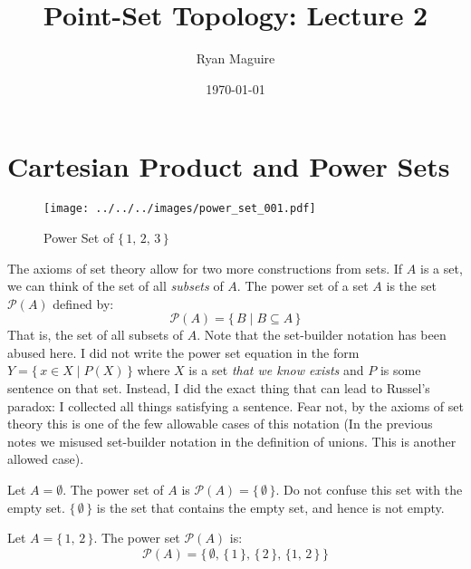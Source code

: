 \documentclass{article}
\title{Point-Set Topology: Lecture 2}
\author{Ryan Maguire}
\date{\today}
\theoremstyle{plain}
\theoremstyle{normal}
\newenvironment{example}{%
    \pushQED{\qed}\renewcommand{\qedsymbol}{$\blacksquare$}\examplex%
}{%
    \popQED\endexamplex%
}
\newenvironment{definition}{%
    \pushQED{\qed}\renewcommand{\qedsymbol}{$\blacksquare$}\definitionx%
}{%
    \popQED\enddefinitionx%
}
\begin{document}
    \maketitle
    \section{Cartesian Product and Power Sets}
        \begin{figure}
            \centering
            \texttt{[image: ../../../images/power\_set\_001.pdf]}
            \caption{Power Set of $\{\,1,\,2,\,3\,\}$}
            \label{fig:power_set_001}
        \end{figure}
        The axioms of set theory allow for two more constructions from sets.
        If $A$ is a set, we can think of the set of all \textit{subsets} of
        $A$.
        \begin{definition}[\textbf{Power Set}]
            The power set of a set $A$ is the set $\mathcal{P}(A)$ defined by:
            \begin{equation}
                \mathcal{P}(A)=\{\,B\;|\;B\subseteq{A}\,\}
            \end{equation}
            That is, the set of all subsets of $A$.
        \end{definition}
        Note that the set-builder notation has been abused here. I did not write
        the power set equation in the form
        $Y=\{\,x\in{X}\;|\;P(X)\,\}$ where $X$ is a set
        \textit{that we know exists} and $P$ is some sentence on that set.
        Instead, I did the exact thing that can lead to Russel's paradox: I
        collected all things satisfying a sentence. Fear not, by the axioms of
        set theory this is one of the few allowable cases of this notation
        (In the previous notes we misused set-builder notation in the
        definition of unions. This is another allowed case).
        \begin{example}
            Let $A=\emptyset$. The power set of $A$ is
            $\mathcal{P}(A)=\{\,\emptyset\,\}$. Do not confuse this set with
            the empty set. $\{\,\emptyset\,\}$ is the set that contains the
            empty set, and hence is not empty.
        \end{example}
        \begin{example}
            Let $A=\{\,1,\,2\,\}$. The power set $\mathcal{P}(A)$ is:
            \begin{equation}
                \mathcal{P}(A)=\big\{\,\emptyset,\,\{\,1\,\},\,
                    \{\,2\,\},\,\{1,\,2\,\}\,\big\}
            \end{equation}
        \end{example}
\end{document}
